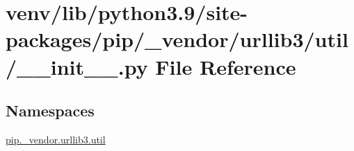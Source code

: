 \hypertarget{venv_2lib_2python3_89_2site-packages_2pip_2__vendor_2urllib3_2util_2____init_____8py}{}\section{venv/lib/python3.9/site-\/packages/pip/\+\_\+vendor/urllib3/util/\+\_\+\+\_\+init\+\_\+\+\_\+.py File Reference}
\label{venv_2lib_2python3_89_2site-packages_2pip_2__vendor_2urllib3_2util_2____init_____8py}
\subsection*{Namespaces}
\begin{DoxyCompactItemize}
\item 
 \hyperlink{namespacepip_1_1__vendor_1_1urllib3_1_1util}{pip.\+\_\+vendor.\+urllib3.\+util}
\end{DoxyCompactItemize}
